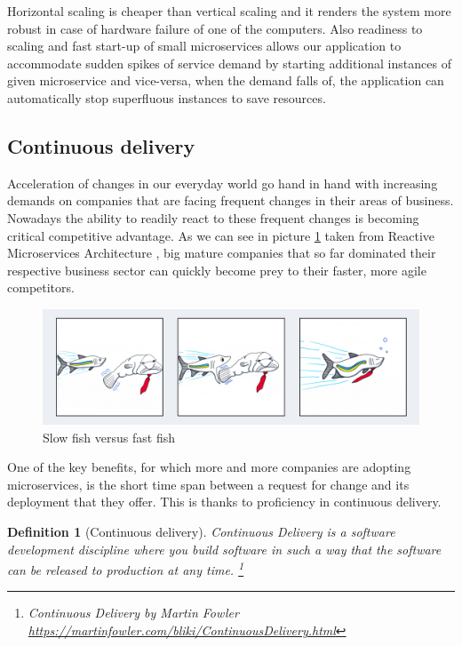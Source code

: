 \documentclass[12pt,oneside]{fithesis2}
\newtheorem{definition}{Definition}
\begin{document}
Horizontal scaling is cheaper than vertical scaling and it renders the system more robust in case of hardware failure of one of the computers. Also readiness to scaling and fast start-up of small microservices allows our application to accommodate sudden spikes of service demand by starting additional instances of given microservice and vice-versa, when the demand falls of, the application can automatically stop superfluous instances to save resources.

\subsection{Continuous delivery}

Acceleration of changes in our everyday world go hand in hand with increasing demands on companies that are facing frequent changes in their areas of business. Nowadays the ability to readily react to these frequent changes is becoming critical competitive advantage. As we can see in picture \ref{fast_fish} taken from Reactive Microservices Architecture \cite{rma}, big mature companies that so far dominated their respective business sector can quickly become prey to their faster, more agile competitors.

\begin{figure}[ht!]
	\label{fast_fish}
	\centering
	\includegraphics[width=\textwidth]{images/fast_fish.png}
	\caption{Slow fish versus fast fish \cite{rma}}
\end{figure}

One of the key benefits, for which more and more companies are adopting microservices, is the short time span between a request for change and its deployment that they offer. This is thanks to proficiency in continuous delivery.

\begin{definition}[Continuous delivery]
Continuous Delivery is a software development discipline where you build software in such a way that the software can be released to production at any time. \footnote{Continuous Delivery by Martin Fowler \url{https://martinfowler.com/bliki/ContinuousDelivery.html}}
\end{definition}
\end{document}
